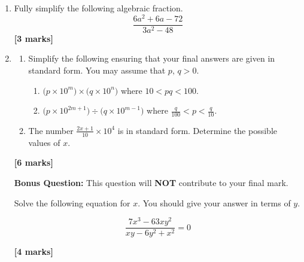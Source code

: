 \documentclass[12pt]{article}
\begin{document}
\begin{enumerate}
    \item Fully simplify the following algebraic fraction.
    \[
    \frac{6a^2+6a-72}{3a^2-48}
    \]
    \vfill \hfill \textbf{[3 marks]}

    \newpage

    \item
    \begin{enumerate}
        \item Simplify the following ensuring that your final answers are given in standard form. You may assume that \(p, \, q>0\). \vspace{0.5cm}
        \begin{enumerate}
            \item \(\big(p \times 10^m\big) \times \big(q \times 10^n \big) \) where \(10<pq<100\). \vspace{5cm}
            \item \( \big(p\times10^{2m+1}\big) \div \big(q\times 10^{m-1}\big) \) where \(\frac{q}{100}<p<\frac{q}{10}\). \vspace{5cm}
        \end{enumerate}
        \item The number \( \frac{2x+1}{10} \times 10^4\) is in standard form. Determine the possible values of \(x\).
    \end{enumerate}
    \vfill \hfill \textbf{[6 marks]}

    \newpage

    \textbf{Bonus Question:} This question will \textbf{NOT} contribute to your final mark.

    

    Solve the following equation for \(x\). You should give your answer in terms of \(y\). \vspace{1cm}

    \[
    \frac{7x^3-63xy^2}{xy-6y^2+x^2}=0
    \]

    \vfill \hfill \textbf{[4 marks]}
    
\end{enumerate}
\end{document}
